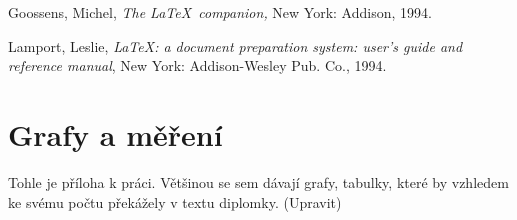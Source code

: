 \documentclass[bc,male,java,dept460]{diploma}						%
\begin{document}
\MakeTitlePages

\tableofcontents
\cleardoublepage	%

\listoftables
\cleardoublepage	%

\listoffigures
\cleardoublepage	%


\lstlistoflistings
\cleardoublepage	%







\begin{thebibliography}{99}

 Goossens, Michel,
\textit{The \LaTeX\ companion,} New York: Addison, 1994.

 Lamport, Leslie,
\textit{\LaTeX: a document preparation system: user's guide and reference manual},
New York: Addison-Wesley Pub. Co., 1994.

\end{thebibliography}


\appendix
\section{Grafy a měření}
Tohle je příloha k práci. Většinou se sem dávají grafy, tabulky, které by vzhledem
ke svému počtu překážely v textu diplomky. (Upravit)
\clearpage

\end{document}
